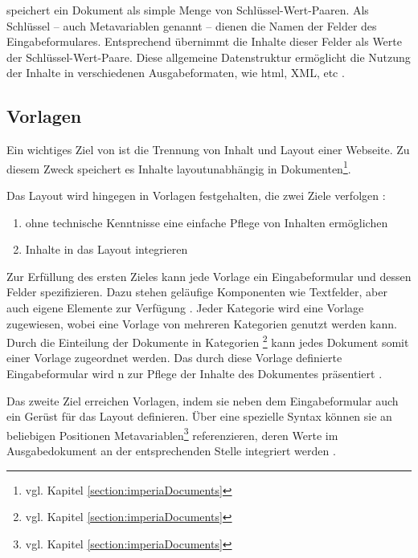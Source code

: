             {\imperia} speichert ein Dokument als simple Menge von
            Schlüssel-Wert-Paaren.
            Als Schlüssel -- auch Metavariablen genannt -- dienen die Namen der Felder des Eingabeformulares.
            Entsprechend übernimmt {\imperia} die Inhalte dieser Felder
            als Werte der Schlüssel-Wert-Paare.
            Diese allgemeine Datenstruktur ermöglicht die Nutzung der Inhalte
            in verschiedenen Ausgabeformaten, wie \gls{html}, XML, etc
            \cite[Kapitel 1.1.2]{imperia:ecmd}.

        \subsection{Vorlagen}
            \label{section:imperiaTemplates}
            Ein wichtiges Ziel von {\imperia} ist die Trennung von Inhalt
            und Layout einer Webseite.
            Zu diesem Zweck speichert es Inhalte layoutunabhängig
            in Dokumenten\footnote{vgl. Kapitel \ref{section:imperiaDocuments}}.

            Das Layout wird hingegen in Vorlagen festgehalten,
            die zwei Ziele verfolgen
            \cite[Kapitel 36]{imperia:ecmd}:

            \begin{enumerate}
                \item {\editors} ohne technische Kenntnisse eine einfache Pflege von Inhalten ermöglichen
                \item Inhalte in das Layout integrieren
            \end{enumerate}

            Zur Erfüllung des ersten Zieles kann jede Vorlage ein Eingabeformular
            und dessen Felder spezifizieren.
            Dazu stehen geläufige Komponenten wie Textfelder,
            aber auch {\imperia} eigene Elemente zur Verfügung
            \cite[Kapitel 1.1.4]{imperia:ecmd}.
            Jeder Kategorie wird eine Vorlage zugewiesen,
            wobei eine Vorlage von mehreren Kategorien genutzt werden kann.
            Durch die Einteilung der Dokumente in Kategorien
            \footnote{vgl. Kapitel \ref{section:imperiaDocuments}}
            kann jedes Dokument somit einer Vorlage zugeordnet werden.
            Das durch diese Vorlage definierte Eingabeformular
            wird {\editors n} zur Pflege der Inhalte des Dokumentes präsentiert
            \cite[Kapitel 1.1.4]{imperia:ecmd}.

            Das zweite Ziel erreichen Vorlagen,
            indem sie neben dem Eingabeformular auch ein Gerüst für das
            Layout definieren.
            Über eine spezielle Syntax können sie an beliebigen Positionen
            Metavariablen\footnote{vgl. Kapitel \ref{section:imperiaDocuments}} referenzieren,
            deren Werte im Ausgabedokument an der entsprechenden Stelle integriert werden
            \cite[Kapitel 36]{imperia:ecmd}.

